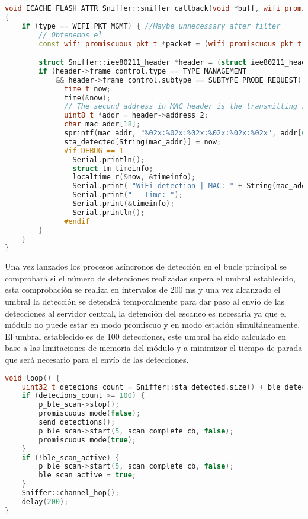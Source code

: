 \documentclass[../proyecto.tex]{subfiles}
\begin{document}
\begin{minipage}{\linewidth}
\begin{lstlisting}[language=C++, caption=Función \textit{callback} para el modo promiscuo , captionpos=b, frame=single]
void ICACHE_FLASH_ATTR Sniffer::sniffer_callback(void *buff, wifi_promiscuous_pkt_type_t type)
{
    if (type == WIFI_PKT_MGMT) { //Maybe unnecessary after filter
        // Obtenemos el
        const wifi_promiscuous_pkt_t *packet = (wifi_promiscuous_pkt_t *)buff;

        struct Sniffer::iee80211_header *header = (struct iee80211_header*) packet->payload;
        if (header->frame_control.type == TYPE_MANAGEMENT
            && header->frame_control.subtype == SUBTYPE_PROBE_REQUEST) {
              time_t now;
              time(&now);
              // The second address in MAC header is the transmitting station.
              uint8_t *addr = header->address_2;
              char mac_addr[18];
              sprintf(mac_addr, "%02x:%02x:%02x:%02x:%02x:%02x", addr[0], addr[1], addr[2], addr[3], addr[4], addr[5]);
              sta_detected[String(mac_addr)] = now;
              #if DEBUG == 1
                Serial.println();
                struct tm timeinfo;
                localtime_r(&now, &timeinfo);
                Serial.print( "WiFi detection | MAC: " + String(mac_addr) );
                Serial.print(" - Time: ");
                Serial.print(&timeinfo);
                Serial.println();
              #endif
        }
    }
}
\end{lstlisting}
\end{minipage}

Una vez lanzados los procesos asíncronos de detección en el bucle principal se comprobará si el número de detecciones realizadas supera el umbral establecido, esta comprobación se realiza en intervalos de 200 ms y una vez alcanzado el umbral la detección se detendrá temporalmente para dar paso al envío de las detecciones al servidor central, la detención del escaneo es necesaria ya que el módulo no puede estar en modo promiscuo y en modo estación simultáneamente. El umbral establecido es de 100 detecciones, este umbral ha sido calculado en base a las limitaciones de memoria del módulo y a minimizar el tiempo de parada que será necesario para el envío de las detecciones.\\

\begin{minipage}{\linewidth}
\begin{lstlisting}[language=C++, caption=Bucle principal , captionpos=b, frame=single]
void loop() {
    uint32_t detecions_count = Sniffer::sta_detected.size() + ble_detected.size();
    if (detecions_count >= 100) {
        p_ble_scan->stop();
        promiscuous_mode(false);
        send_detections();
        p_ble_scan->start(5, scan_complete_cb, false);
        promiscuous_mode(true);
    }
    if (!ble_scan_active) {
        p_ble_scan->start(5, scan_complete_cb, false);
        ble_scan_active = true;
    }
    Sniffer::channel_hop();
    delay(200);
}
\end{lstlisting}
\end{minipage}
\end{document}
